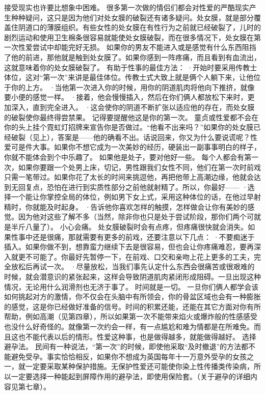 \documentclass[12pt,UTF8]{ctexbook}
\begin{document}
接受现实也许要比想象中困难。
很多第一次做的情侣们都会对性爱的严酷现实产生种种疑问，这只是因为他们对处女膜的破裂还有诸多疑问。处女膜，就是部分覆盖住阴道口的薄膜组织。有些女性的处女膜在有性行为之前就已经破裂了，儿时的剧烈运动和使用卫生棉条很容易就能使处女膜破裂，而在很多情况下，处女膜在第一次性爱尝试中却能完好无损。
如果你的男友不能进入或是感觉有什么东西阻挡了他的前进，那他就是触到处女膜了。如果你感到一阵疼痛，而且看到有血流出，这就意味着你的处女膜破裂了。
有助于性事的最佳方法：
·开始时要采用传教士体位，这对“第一次”来讲是最佳体位。传教士式大致上就是俩个人躺下来，让他位于你的上方。
·当他第一次进入你的时候，用你的阴道肌肉将他向下推挤，就像要小便的感觉一样。
·接着，他会慢慢插入，然后在你们俩人都放松下来时，更加深入，直到完全进入。
·这会使你的阴道不断扩张以适应他的存在，而处女膜的破裂使你最终得尝禁果。
记得要提醒他这是你的第一次。
童贞或性爱都不会在你的头上挂个霓虹灯招牌来宣告你是否做过。“他看不出来吗？”如果你的处女膜已经破裂（见上），答案是——他的确看不出。话说回来，你又为什么要说谎呢？性爱可是件大事。如果你不想它成为一次美妙的经历，硬装出一副事事明白的样子，你就不能体会到个中乐趣了。
如果他是处子，要对他好一些。
每个人都会有第一次，如果你要跟一个处男上床，切记，男性跟我们女性不同，他们在第一次时前戏只需一笔带过。如果你花了太长的时间来挑逗他，再把他带上高潮边缘，他就会达到无回复点，恐怕在进行到实质性部分之前他就射精了。所以，你最好——
·选择一个能让你掌控全局的体位，例如男下女上式，采用这种体位的话，在他过早射精时，你就能及时起身。
·告诉他你喜欢怎样的触摸，怎样做会让你有美妙的感觉。因为他对这些了解不多（当然，除非你也只是处于尝试阶段，那你们两个可就是半斤八量了）。
小心会痛。
处女膜破裂时会有点疼，但疼痛很快就会消失。如果性事中还是很痛，那就需要有更多的前戏，还要注意以下几点：
·不要痴迷于插入。如果你做不到，想靠蛮力继续下去是很容易，但也会让你疼痛难忍，要再深入就更不可能了。你最好先暂停一下，在前戏、口交和亲吻上花上更多的工夫，完全放松后再试一次。
·尽量放松，当我们事先认定什么东西会很痛苦或很艰难的时候，就会潜意识的紧张起来，这样会导致阴道肌肉紧闭形成阻碍。一旦出现这种情况，无论用什么润滑剂也无济于事了。
时间就是一切。
一旦你们俩人都学会该如何挑起对方的激情，你不仅会在头脑中有所领会，你的骨盆区域也会有一种膨胀的感觉，这是你已经做好准备的信号。时间的积累还能，还能在其它方面对你有所帮助，例如高潮（见第四章），所以如果第一次不能带来焰火或爆炸般的性感感受也没什么好奇怪的。就像第一次约会一样，有一点尴尬和难为情都是在所难免。而且这也不能代表以后的情形。性爱这种事，也是做得越多，就能做得越好。
选择避孕法。
民间有一种说法，“第一次”的时候，即使他采取“及时撤退”的方法都不能避免受孕。事实恰恰相反，如果你不想成为英国每年十一万意外受孕的女孩之一，就一定要采取某种保护措施。无保护性爱还可能使你染上性传播类传染病，所以一定要选择一种能起到屏障作用的避孕法，即使用保险套。（关于避孕的详细内容见第七章）。
\end{document}
